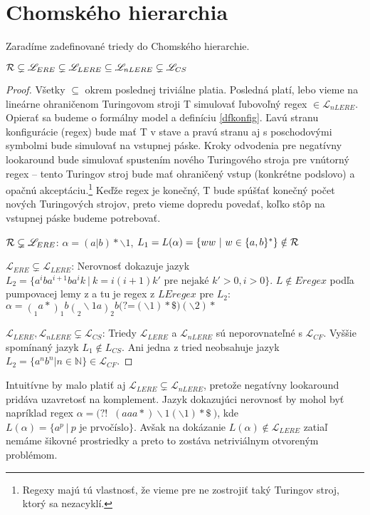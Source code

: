 \documentclass{svk_long_sk}
\def\R{{\cal R}} %
\def\L{\mathscr{L}} %
\def\N{\mathds{N}} %
\def\e{Eregex}
\def\le{LEregex}
\def\el{\mathscr{L}_{ERE}}
\def\lel{\mathscr{L}_{LERE}}
\def\nlel{\mathscr{L}_{nLERE}}
\def\lookahead{\text{(?=}}
\def\nlookahead{\text{(?!~}}
\begin{document}
\section{Chomského hierarchia}
Zaradíme zadefinované triedy do Chomského hierarchie.
\begin{theorem}
$\R \subsetneq \el \subsetneq \lel \subseteq \nlel \subsetneq \L_{CS}$
\end{theorem}
\begin{proof}

Všetky $\subseteq$ okrem poslednej triviálne platia. Posledná platí, lebo vieme na lineárne ohraničenom Turingovom stroji T simulovať ľubovoľný regex $\in\nlel$. Opierať sa budeme o formálny model a definíciu \ref{dfkonfig}. Ľavú stranu konfigurácie (regex) bude mať T v stave a pravú stranu aj s poschodovými symbolmi bude simulovať na vstupnej páske. Kroky odvodenia pre negatívny lookaround bude simulovať spustením nového Turingového stroja pre vnútorný regex -- tento Turingov stroj bude mať ohraničený vstup (konkrétne podslovo) a opačnú akceptáciu.\footnote{Regexy majú tú vlastnosť, že vieme pre ne zostrojiť taký Turingov stroj, ktorý sa nezacyklí.} Keďže regex je konečný, T bude spúšťať konečný počet nových Turingových strojov, preto vieme dopredu povedať, koľko stôp na vstupnej páske budeme potrebovať.

$\R \subsetneq \el$: $\alpha = (a|b)*\backslash 1$, $L_1 = L(\alpha)=\lbrace ww~|~w\in\lbrace a,b \rbrace^*\rbrace \notin \R$

$\el \subsetneq \lel$: Nerovnosť dokazuje jazyk $L_2=\lbrace a^iba^{i+1}ba^ik ~|~ k=i(i+1)k' \text{ pre nejaké } k'>0,i>0\rbrace$. $L\notin\e$ podľa pumpovacej lemy z \cite{ExtendedRegexIntersec} a tu je regex z $\le$ pre $L_2$: 
$\alpha=\displaystyle{\mathop{(}_1 a*\mathop{)}_1 b \mathop{(}_2 \backslash 1 a \mathop{)}_2 b \lookahead (\backslash 1) *\$ ) (\backslash 2)* }$

$\lel,\nlel \subsetneq \L_{CS}$: Triedy $\lel$ a $\nlel$ sú neporovnateľné s $\L_{CF}$. Vyššie spomínaný jazyk $L_1 \notin L_{CS}$. Ani jedna z tried neobsahuje jazyk $L_2=\lbrace a^nb^n|n\in\N\rbrace \in \L_{CF}$.
\end{proof}

Intuitívne by malo platiť aj $\lel \subsetneq \nlel$, pretože negatívny lookaround pridáva uzavretosť na komplement. Jazyk dokazujúci nerovnosť by mohol byť napríklad regex $\alpha =\nlookahead ~(aaa*)\backslash 1(\backslash 1)* \$~)$, kde $L(\alpha)= \lbrace a^p ~|~ p \text{ je prvočíslo} \rbrace$. Avšak na dokázanie $L(\alpha)\notin\lel$ zatiaľ nemáme šikovné prostriedky a preto to zostáva netriviálnym otvoreným problémom.
\end{document}
